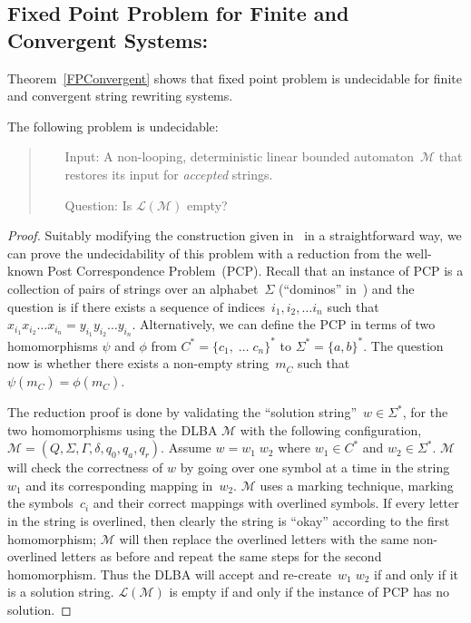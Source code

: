 \documentclass{lmcs} %
\theoremstyle{plain}\newtheorem{satz}[thm]{Satz} %
\begin{document}
\subsection{Fixed Point Problem for Finite and Convergent Systems:}

Theorem~\ref{FPConvergent} shows that fixed point problem is undecidable for finite and convergent string rewriting systems.

\begin{thm}
The following problem is undecidable: \begin{quote}
\begin{itemize}
\item[Input:] A non-looping, deterministic linear bounded automaton~$\mathcal{M}$ that
restores its input for \emph{accepted} strings.
\item[Question:] Is $\mathcal{L(M)}$ empty?
\end{itemize}
\end{quote}
\end{thm}

\begin{proof}

Suitably modifying the construction given in~\cite{caron1991linear} in a straightforward way, we can prove the undecidability of this problem with a reduction from the well-known
Post Correspondence Problem~(PCP). Recall that an instance of PCP is a
collection of pairs of strings over an alphabet~$\Sigma$ (``dominos'' in~\cite{Sipser}) and
the question is if there exists a sequence of
indices~$i_1, i_2, \ldots i_n$ such that
$x_{i_1}  x_{i_2} \ldots x_{i_n} = y_{i_1} y_{i_2} \ldots y_{i_n}$.
Alternatively, we can define the PCP in terms
of two homomorphisms
$\psi$ and $\phi$ from $C^*=\{c_1,\;\ldots\;c_n\}^*$ to $\Sigma^* =
\{a,b\}^*$. The question now is whether there exists a non-empty
string~$m_C^{}$ such that
$\psi(m_C^{}) = \phi(m_C^{})$.

The reduction proof is done by validating the ``solution string''~$w
\in \Sigma^*$, for the two homomorphisms using the DLBA $\mathcal{M}$
with the following configuration, $\mathcal{M} = (Q, \Sigma, \Gamma,
\delta, q_0, q_a, q_r)$. Assume $w=w_1 \; w_2$ where $w_1 \in C^*$ and
$w_2 \in \Sigma^*$. $\mathcal{M}$ will check the correctness of $w$ by
going over one symbol at a time in the string $w_1$ and its
corresponding mapping in~$w_2$. $\mathcal{M}$ uses a marking
technique, marking the symbols~$c_i$ and their correct mappings with
overlined symbols. If every letter in the string is overlined, then
clearly the string is ``okay'' according to the first homomorphism;
$\mathcal{M}$ will then replace the overlined letters with the same
non-overlined letters as before and repeat the same steps for the
second homomorphism. Thus the DLBA will accept and re-create~$w_1 \;
w_2$ if and only if it is a solution string. $\mathcal{L(M)}$ is empty if and only if the instance of PCP has no solution.
\end{proof}
\end{document}
